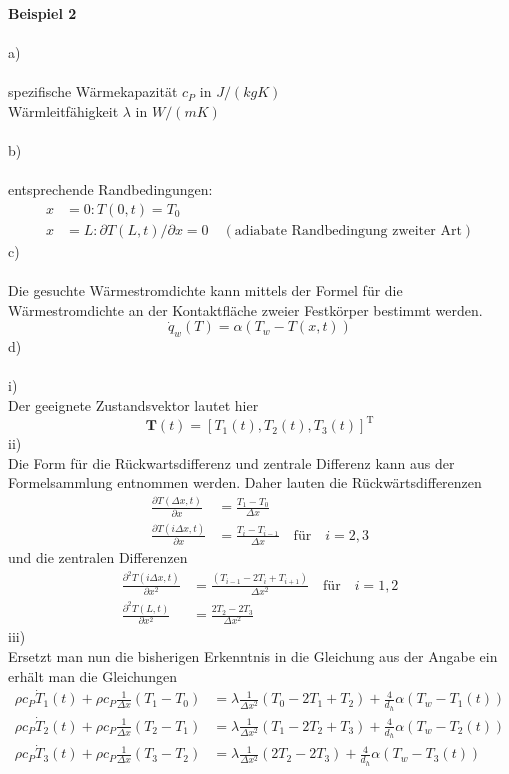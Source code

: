 \newpage
\noindent
\textbf{Beispiel 2}\\ \\
a)\\ \\
spezifische Wärmekapazität $c_P$ in $J/(kgK)$ \\
Wärmleitfähigkeit $\lambda$ in $W/(mK)$ \\ \\
b)\\ \\
entsprechende Randbedingungen: \\ 
\begin{align*}
	x &= 0: T(0,t) = T_0 \\
	x &= L: \partial T(L,t)/\partial x = 0 \quad (\text{adiabate Randbedingung zweiter Art})
\end{align*}
c) \\ \\
Die gesuchte Wärmestromdichte kann mittels der Formel für die Wärmestromdichte an der Kontaktfläche zweier Festkörper bestimmt werden.
\[
	\dot{q}_w(T) = \alpha (T_w - T(x,t))
\]
d)\\ \\
i)\\
Der geeignete Zustandsvektor lautet hier
\[
	\textbf{T}(t) = [T_1(t),T_2(t),T_3(t)]^\text{T}
\]
ii)\\
Die Form für die Rückwartsdifferenz und zentrale Differenz kann aus der Formelsammlung entnommen werden. Daher lauten die Rückwärtsdifferenzen
\begin{align*}
	\frac{\partial T(\Delta x,t)}{\partial x} &= \frac{T_1 - T_0}{\Delta x} \\
	\frac{\partial T(i\Delta x,t)}{\partial x} &= \frac{T_i - T_{i-1}}{\Delta x} \quad \text{für} \quad i = 2,3
\end{align*}
und die zentralen Differenzen
\begin{align*}
	\frac{\partial^2 T(i\Delta x,t)}{\partial x^2} &= \frac{(T_{i-1} - 2T_i + T_{i+1})}{\Delta x^2} \quad \text{für} \quad i = 1,2 \\
	\frac{\partial^2 T(L,t)}{\partial x^2} &= \frac{2T_2 - 2T_3}{\Delta x^2}
\end{align*}
\newpage
\noindent
iii)\\
Ersetzt man nun die bisherigen Erkenntnis in die Gleichung aus der Angabe ein erhält man die Gleichungen
\begin{align*}
	\rho c_P \dot{T}_1(t) + \rho c_P \frac{1}{\Delta x}(T_1 - T_0) &= \lambda \frac{1}{\Delta x^2}(T_0 - 2T_1 + T_2) + \frac{4}{d_h}\alpha (T_w - T_1(t)) \\
	\rho c_P \dot{T}_2(t) + \rho c_P \frac{1}{\Delta x}(T_2 - T_1) &= \lambda \frac{1}{\Delta x^2}(T_1 - 2T_2 + T_3) + \frac{4}{d_h}\alpha (T_w - T_2(t)) \\
	\rho c_P \dot{T}_3(t) + \rho c_P \frac{1}{\Delta x}(T_3 - T_2) &= \lambda \frac{1}{\Delta x^2}(2T_2 - 2T_3) + \frac{4}{d_h}\alpha (T_w - T_3(t))
\end{align*}
